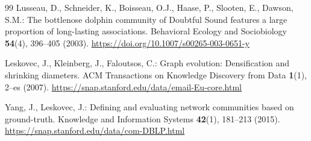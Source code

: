 \documentclass{svproc}
\begin{document}
{\begin{thebibliography}{99}
Lusseau, D., Schneider, K., Boisseau, O.J., Haase, P., Slooten, E., Dawson, S.M.: The bottlenose dolphin community of Doubtful Sound features a large proportion of long-lasting associations. Behavioral Ecology and Sociobiology \textbf{54}(4), 396--405 (2003). \url{https://doi.org/10.1007/s00265-003-0651-y}

Leskovec, J., Kleinberg, J., Faloutsos, C.: Graph evolution: Densification and shrinking diameters. ACM Transactions on Knowledge Discovery from Data \textbf{1}(1), 2--es (2007). \url{https://snap.stanford.edu/data/email-Eu-core.html}

Yang, J., Leskovec, J.: Defining and evaluating network communities based on ground-truth. Knowledge and Information Systems \textbf{42}(1), 181--213 (2015). \url{https://snap.stanford.edu/data/com-DBLP.html}

\end{thebibliography}
}
\end{document}
